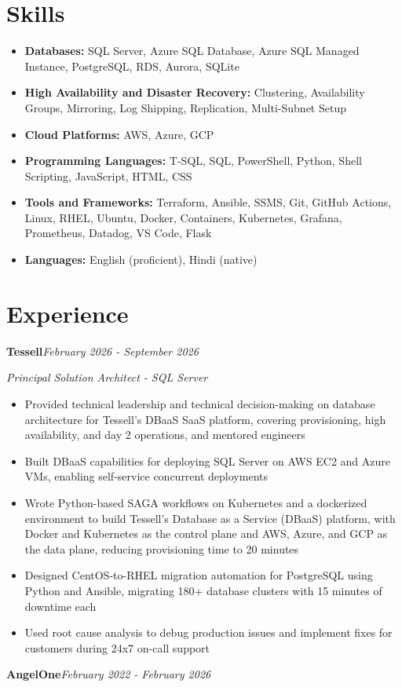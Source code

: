 \documentclass[10pt,a4paper]{article}
\begin{document}
\section{Skills}
\begin{itemize}
  \item \textbf{Databases:} SQL Server, Azure SQL Database, Azure SQL Managed Instance, PostgreSQL, RDS, Aurora, SQLite
  \item \textbf{High Availability and Disaster Recovery:} Clustering, Availability Groups, Mirroring, Log Shipping, Replication, Multi-Subnet Setup
  \item \textbf{Cloud Platforms:} AWS, Azure, GCP
  \item \textbf{Programming Languages:} T-SQL, SQL, PowerShell, Python, Shell Scripting, JavaScript, HTML, CSS
  \item \textbf{Tools and Frameworks:} Terraform, Ansible, SSMS, Git, GitHub Actions, Linux, RHEL, Ubuntu, Docker, Containers, Kubernetes, Grafana, Prometheus, Datadog, VS Code, Flask
  \item \textbf{Languages:} English (proficient), Hindi (native)
\end{itemize}

\section{Experience}

\noindent\textbf{Tessell}\hfill \textit{February 2026 - September 2026}

\textit{Principal Solution Architect - SQL Server}\\[-5pt]
\begin{itemize}
  \item Provided technical leadership and technical decision-making on database architecture for Tessell's DBaaS SaaS platform, covering provisioning, high availability, and day 2 operations, and mentored engineers
  \item Built DBaaS capabilities for deploying SQL Server on AWS EC2 and Azure VMs, enabling self-service concurrent deployments
  \item Wrote Python-based SAGA workflows on Kubernetes and a dockerized environment to build Tessell's Database as a Service (DBaaS) platform, with Docker and Kubernetes as the control plane and AWS, Azure, and GCP as the data plane, reducing provisioning time to 20 minutes
  \item Designed CentOS-to-RHEL migration automation for PostgreSQL using Python and Ansible, migrating 180+ database clusters with 15 minutes of downtime each
  \item Used root cause analysis to debug production issues and implement fixes for customers during 24x7 on-call support
\end{itemize}
\vspace{14.7pt}
\noindent\textbf{AngelOne}\hfill \textit{February 2022 - February 2026}
\end{document}
